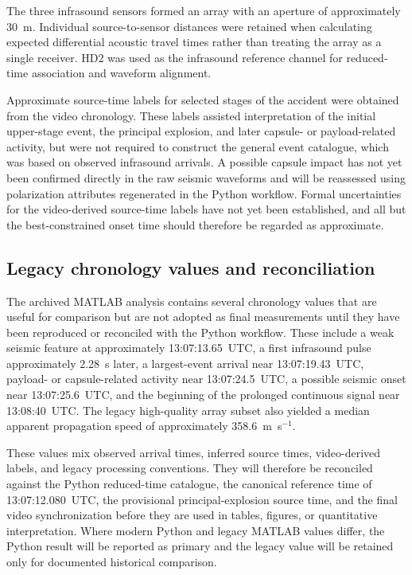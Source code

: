 \documentclass[]{seismica}
\begin{document}
The three infrasound sensors formed an array with an aperture of approximately
30~m. Individual source-to-sensor distances were retained when calculating
expected differential acoustic travel times rather than treating the array as
a single receiver. HD2 was used as the infrasound reference channel for
reduced-time association and waveform alignment.

Approximate source-time labels for selected stages of the accident were
obtained from the video chronology. These labels assisted interpretation of the
initial upper-stage event, the principal explosion, and later
capsule- or payload-related activity, but were not required to construct the
general event catalogue, which was based on observed infrasound arrivals. A
possible capsule impact has not yet been confirmed directly in the raw seismic
waveforms and will be reassessed using polarization attributes regenerated in
the Python workflow. Formal uncertainties for the video-derived source-time
labels have not yet been established, and all but the best-constrained onset
time should therefore be regarded as approximate.

\subsection{Legacy chronology values and reconciliation}
\label{sec:methods_legacy_chronology}

The archived MATLAB analysis contains several chronology values that are useful
for comparison but are not adopted as final measurements until they have been
reproduced or reconciled with the Python workflow. These include a weak seismic
feature at approximately 13:07:13.65~UTC, a first infrasound pulse approximately
2.28~s later, a largest-event arrival near 13:07:19.43~UTC, payload- or
capsule-related activity near 13:07:24.5~UTC, a possible seismic onset near
13:07:25.6~UTC, and the beginning of the prolonged continuous signal near
13:08:40~UTC. The legacy high-quality array subset also yielded a median
apparent propagation speed of approximately 358.6~m~s$^{-1}$.

These values mix observed arrival times, inferred source times, video-derived
labels, and legacy processing conventions. They will therefore be reconciled
against the Python reduced-time catalogue, the canonical reference time of
13:07:12.080~UTC, the provisional principal-explosion source time, and the
final video synchronization before they are used in tables, figures, or
quantitative interpretation. Where modern Python and legacy MATLAB values
differ, the Python result will be reported as primary and the legacy value will
be retained only for documented historical comparison.
\end{document}
